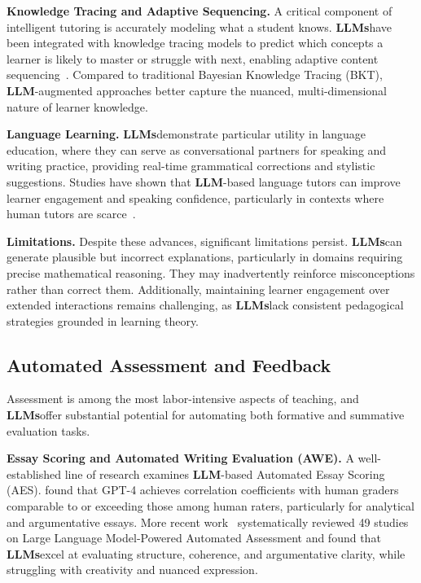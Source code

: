 \documentclass[preprint,12pt]{article}
\newcommand{\LLM}{\textbf{LLM}}
\newcommand{\LLMs}{\textbf{LLMs}}
\theoremstyle{mystyle}
\begin{document}
\textbf{Knowledge Tracing and Adaptive Sequencing.} A critical component of intelligent tutoring is accurately modeling what a student knows. \LLMs have been integrated with knowledge tracing models to predict which concepts a learner is likely to master or struggle with next, enabling adaptive content sequencing~\citep{liu2024knowledge}. Compared to traditional Bayesian Knowledge Tracing (BKT), \LLM-augmented approaches better capture the nuanced, multi-dimensional nature of learner knowledge.

\textbf{Language Learning.} \LLMs demonstrate particular utility in language education, where they can serve as conversational partners for speaking and writing practice, providing real-time grammatical corrections and stylistic suggestions. Studies have shown that \LLM-based language tutors can improve learner engagement and speaking confidence, particularly in contexts where human tutors are scarce~\citep{chassignet2024llm}.

\textbf{Limitations.} Despite these advances, significant limitations persist. \LLMs can generate plausible but incorrect explanations, particularly in domains requiring precise mathematical reasoning. They may inadvertently reinforce misconceptions rather than correct them. Additionally, maintaining learner engagement over extended interactions remains challenging, as \LLMs lack consistent pedagogical strategies grounded in learning theory.

\subsection{Automated Assessment and Feedback}
\label{sec:assessment}

Assessment is among the most labor-intensive aspects of teaching, and \LLMs offer substantial potential for automating both formative and summative evaluation tasks.

\textbf{Essay Scoring and Automated Writing Evaluation (AWE).} A well-established line of research examines \LLM-based Automated Essay Scoring (AES). \citep{riechelman2024llm} found that GPT-4 achieves correlation coefficients with human graders comparable to or exceeding those among human raters, particularly for analytical and argumentative essays. More recent work~\citep{llmpaa2025} systematically reviewed 49 studies on Large Language Model-Powered Automated Assessment and found that \LLMs excel at evaluating structure, coherence, and argumentative clarity, while struggling with creativity and nuanced expression.
\end{document}
